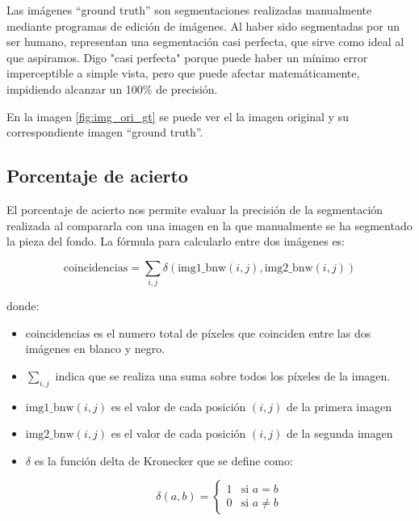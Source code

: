 Las imágenes ``ground truth'' son segmentaciones realizadas manualmente mediante programas de edición de imágenes. Al haber sido segmentadas por un ser humano, representan una segmentación casi perfecta, que sirve como ideal al que aspiramos. Digo "casi perfecta" porque puede haber un mínimo error imperceptible a simple vista, pero que puede afectar matemáticamente, impidiendo alcanzar un 100\% de precisión.

En la imagen \ref{fig:img_ori_gt} se puede ver el la imagen original y su correspondiente imagen ``ground truth''.

\subsection{Porcentaje de acierto}\label{porcentaje-de-acierto}

El porcentaje de acierto nos permite evaluar la precisión de la segmentación realizada al compararla con una imagen en la que manualmente se ha segmentado la pieza del fondo. La fórmula para calcularlo entre dos imágenes es:

$$\text{coincidencias} = \sum_{i,j} \delta(\text{img1\_bnw}(i,j), \text{img2\_bnw}(i,j))$$

donde:

\begin{itemize}
\setlength{\itemsep}{-1ex}
    \item{\begin{flushleft}  $\text{coincidencias}$ es el numero total de píxeles que coinciden entre las dos imágenes en blanco y negro. \end{flushleft}}
    \item{\begin{flushleft} $\sum_{i,j}$ indica que se realiza una suma sobre todos los píxeles de la imagen. \end{flushleft}}
    \item{\begin{flushleft} $\text{img1\_bnw}(i,j)$ es el valor de cada posición $(i,j)$ de la primera imagen \end{flushleft}}
    \item{\begin{flushleft} $\text{img2\_bnw}(i,j)$ es el valor de cada posición $(i,j)$ de la segunda imagen \end{flushleft}}
    \item{\begin{flushleft} $\delta$ es la función delta de Kronecker que se define como:

    $$\delta(a, b) = 
    \begin{cases} 
    1 & \text{si } a = b \\
    0 & \text{si } a \neq b 
    \end{cases}$$
    \end{flushleft}}
\end{itemize}

